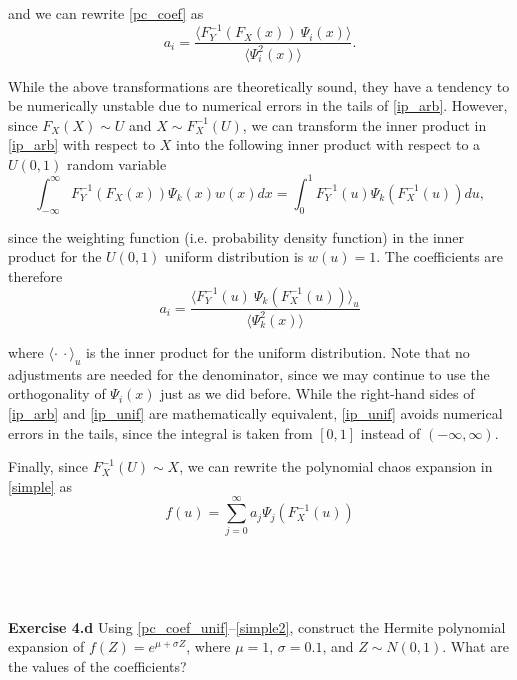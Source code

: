 \documentclass[11pt]{article}
\numberwithin{equation}{section}
\begin{document}
and we can rewrite \eqref{pc_coef} as
\begin{equation}
a_i = \frac{\langle F_Y^{-1} (F_X(x)) \ \Psi_i(x) \rangle}{\langle \Psi_i^2(x) \rangle}. \label{pc_coef_arb}
\end{equation}

\qquad While the above transformations are theoretically sound, they have a tendency to be numerically unstable due to numerical errors in the tails of \eqref{ip_arb}. However, since $F_X(X) \sim U$ and $X \sim F_X^{-1}(U)$, we can transform the inner product in \eqref{ip_arb} with respect to $X$ into the following inner product with respect to a $U(0, 1)$ random variable
\begin{equation}
\int_{-\infty}^{\infty} F_Y^{-1} (F_X(x)) \Psi_k(x) w(x) dx = \int_{0}^{1} F_Y^{-1} (u) \Psi_k(F_X^{-1}(u)) du, \label{ip_unif}
\end{equation}

since the weighting function (i.e. probability density function) in the inner product for the $U(0,1)$ uniform distribution is $w(u) = 1$. The coefficients are therefore
\begin{equation}
a_i = \frac{\langle F_Y^{-1}(u) \ \Psi_k(F_X^{-1}(u)) \rangle_u}{\langle \Psi_k^2(x) \rangle} \label{pc_coef_unif}
\end{equation}

where $\langle \cdot \ \cdot \rangle_u$ is the inner product for the uniform distribution. Note that no adjustments are needed for the denominator, since we may continue to use the orthogonality of $\Psi_i(x)$ just as we did before. While the right-hand sides of \eqref{ip_arb} and \eqref{ip_unif} are mathematically equivalent, \eqref{ip_unif} avoids numerical errors in the tails, since the integral is taken from $[0, 1]$ instead of $(-\infty, \infty)$.

\qquad Finally, since $F_X^{-1}(U) \sim X$, we can rewrite the polynomial chaos expansion in \eqref{simple} as
\begin{equation}
f(u) = \sum_{j=0}^{\infty}  a_j \Psi_j(F_X^{-1}(u)) \label{simple2}
\end{equation}





\

\

\textbf{Exercise 4.d} Using \eqref{pc_coef_unif}--\eqref{simple2}, construct the Hermite polynomial expansion of $f(Z) = e^{\mu + \sigma Z}$, where $\mu = 1$, $\sigma = 0.1$, and $Z \sim N(0,1)$. What are the values of the coefficients?
\end{document}
